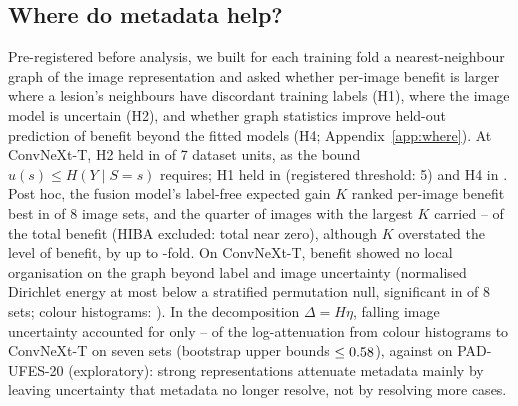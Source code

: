 \documentclass[conference]{IEEEtran}
\begin{document}
\subsection{Where do metadata help?}\label{sec:where}
Pre-registered before analysis, we built for each training fold a nearest-neighbour graph of the image representation and asked whether per-image benefit is larger where a lesion's neighbours have discordant training labels (H1), where the image model is uncertain (H2), and whether graph statistics improve held-out prediction of benefit beyond the fitted models (H4; Appendix~\ref{app:where}). At ConvNeXt-T, H2 held in \GRPhTwo{} of 7 dataset units, as the bound $u(s)\le H(Y\mid S=s)$ requires; H1 held in \GRPhOne{} (registered threshold: 5) and H4 in \GRPhFour{}. Post hoc, the fusion model's label-free expected gain $K$ ranked per-image benefit best in \GRPkBest{} of 8 image sets, and the quarter of images with the largest $K$ carried \GRPcapMin{}--\GRPcapMax{} of the total benefit (HIBA excluded: total near zero), although $K$ overstated the level of benefit, by up to \KoverDmax{}-fold. On ConvNeXt-T, benefit showed no local organisation on the graph beyond label and image uncertainty (normalised Dirichlet energy at most \SMOOTHcnxMax{} below a stratified permutation null, significant in \SMOOTHcnxSig{} of 8 sets; colour histograms: \SMOOTHhsvSig{}). In the decomposition $\Delta=H\eta$, falling image uncertainty accounted for only \DECshareMin{}--\DECshareMax{} of the log-attenuation from colour histograms to ConvNeXt-T on seven sets (bootstrap upper bounds $\le0.58$), against \DECpad{} \DECpadCI{} on PAD-UFES-20 (exploratory): strong representations attenuate metadata mainly by leaving uncertainty that metadata no longer resolve, not by resolving more cases.
\end{document}
